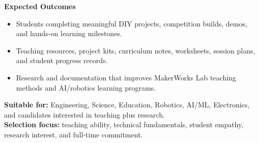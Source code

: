 \documentclass[10pt,a4paper]{article}
\newcommand{\RoleSection}[1]{\vspace{5pt}\par\noindent\textbf{#1}\par\vspace{2pt}}
\begin{document}
{\RoleSection{Expected Outcomes}
\begin{itemize}
  \item Students completing meaningful DIY projects, competition builds, demos, and hands-on learning milestones.
  \item Teaching resources, project kits, curriculum notes, worksheets, session plans, and student progress records.
  \item Research and documentation that improves MakerWorks Lab teaching methods and AI/robotics learning programs.
\end{itemize}

\textbf{Suitable for:} Engineering, Science, Education, Robotics, AI/ML, Electronics, and candidates interested in teaching plus research.\\
\textbf{Selection focus:} teaching ability, technical fundamentals, student empathy, research interest, and full-time commitment.
}
\end{document}
